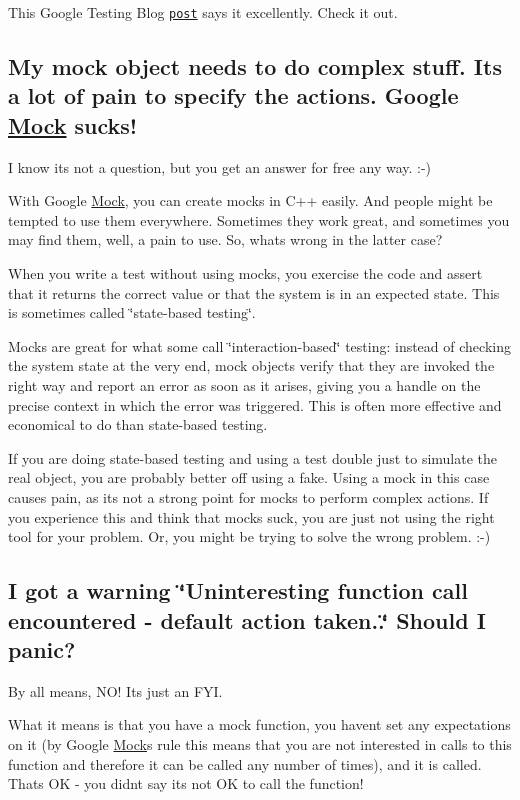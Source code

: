 This Google Testing Blog \href{http://googletesting.blogspot.com/2008/06/defeat-static-cling.html}{\tt post} says it excellently. Check it out.

\subsection*{My mock object needs to do complex stuff. It\textquotesingle{}s a lot of pain to specify the actions. Google \hyperlink{class_mock}{Mock} sucks!}

I know it\textquotesingle{}s not a question, but you get an answer for free any way. \+:-\/)

With Google \hyperlink{class_mock}{Mock}, you can create mocks in C++ easily. And people might be tempted to use them everywhere. Sometimes they work great, and sometimes you may find them, well, a pain to use. So, what\textquotesingle{}s wrong in the latter case?

When you write a test without using mocks, you exercise the code and assert that it returns the correct value or that the system is in an expected state. This is sometimes called \char`\"{}state-\/based testing\char`\"{}.

Mocks are great for what some call \char`\"{}interaction-\/based\char`\"{} testing\+: instead of checking the system state at the very end, mock objects verify that they are invoked the right way and report an error as soon as it arises, giving you a handle on the precise context in which the error was triggered. This is often more effective and economical to do than state-\/based testing.

If you are doing state-\/based testing and using a test double just to simulate the real object, you are probably better off using a fake. Using a mock in this case causes pain, as it\textquotesingle{}s not a strong point for mocks to perform complex actions. If you experience this and think that mocks suck, you are just not using the right tool for your problem. Or, you might be trying to solve the wrong problem. \+:-\/)

\subsection*{I got a warning \char`\"{}\+Uninteresting function call encountered -\/ default action taken..\char`\"{} Should I panic?}

By all means, N\+O! It\textquotesingle{}s just an F\+YI.

What it means is that you have a mock function, you haven\textquotesingle{}t set any expectations on it (by Google \hyperlink{class_mock}{Mock}\textquotesingle{}s rule this means that you are not interested in calls to this function and therefore it can be called any number of times), and it is called. That\textquotesingle{}s OK -\/ you didn\textquotesingle{}t say it\textquotesingle{}s not OK to call the function!

